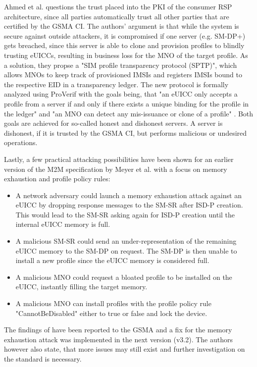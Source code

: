 Ahmed et al. \parencite{Ahmed:TransparancyProfile} questions the trust placed into the PKI of the consumer RSP architecture, since all parties automatically trust all other parties that are certified by the GSMA CI.
The authors' argument is that while the system is secure against outside attackers, it is compromised if one server (e.g. SM-DP+) gets breached, since this server is able to clone and provision profiles to blindly trusting eUICCs, resulting in business loss for the MNO of the target profile. As a solution, they propse a "SIM profile transparency protocol (SPTP)", which allows MNOs to keep track of provisioned IMSIs and registers IMSIs bound to the respective EID in a transparency ledger. 
The new protocol is formally analyzed using ProVerif with the goals being, that "an eUICC only accepts a profile from a server if and only if there exists a unique binding for the profile in the ledger" and "an MNO can detect any mis-issuance or clone of a profile" \parencite{Ahmed:TransparancyProfile}. Both goals are achieved for so-called honest and dishonest servers. A server is dishonest, if it is trusted by the GSMA CI, but performs malicious or undesired operations.

Lastly, a few practical attacking possibilities have been shown for an earlier version of the M2M specification \parencite{SGP:02v3} by Meyer et al. \parencite{Meyer:AttackseSIM} with a focus on memory exhaustion and profile policy rules: 
\begin{itemize}
    \item A network adversary could launch a memory exhaustion attack against an eUICC by dropping response messages to the SM-SR after ISD-P creation. This would lead to the SM-SR asking again for ISD-P creation until the internal eUICC memory is full.
    \item A malicious SM-SR could send an under-representation of the remaining eUICC memory to the SM-DP on request. The SM-DP is then unable to install a new profile since the eUICC memory is considered full.
    \item A malicious MNO could request a bloated profile to be installed on the eUICC, instantly filling the target memory.
    \item A malicious MNO can install profiles with the profile policy rule "CannotBeDisabled" either to true or false and lock the device.
\end{itemize}
The findings of \parencite{Meyer:AttackseSIM} have been reported to the GSMA and a fix for the memory exhaustion attack was implemented in the next version (v3.2). The authors however also state, that more issues may still exist and further investigation on the standard is necessary.

